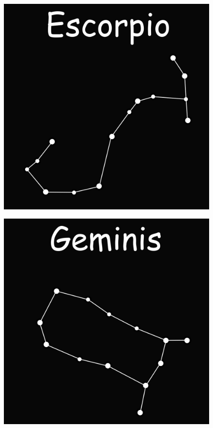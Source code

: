 \documentclass{beamer}
\begin{document}
\begin{frame}
 \begin{figure}
   \centering
   \includegraphics[scale=0.2]{Imagenes/Escorpio_01}
  \end{figure}
\end{frame}

\begin{frame}
 \begin{figure}
   \centering
   \includegraphics[scale=0.2]{Imagenes/Geminis_01}
  \end{figure}
\end{frame}
\end{document}
